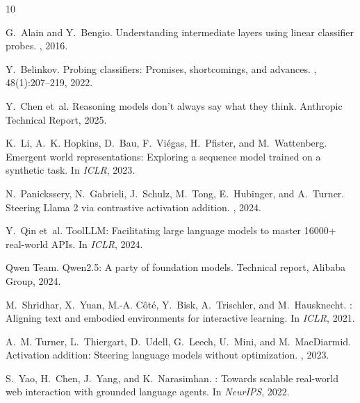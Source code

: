 \documentclass[11pt]{article}
\begin{document}

\begin{thebibliography}{10}

G.~Alain and Y.~Bengio.
\newblock Understanding intermediate layers using linear classifier probes.
, 2016.

Y.~Belinkov.
\newblock Probing classifiers: Promises, shortcomings, and advances.
, 48(1):207--219, 2022.

Y.~Chen et~al.
\newblock Reasoning models don't always say what they think.
\newblock Anthropic Technical Report, 2025.

K.~Li, A.~K. Hopkins, D.~Bau, F.~Vi{\'e}gas, H.~Pfister, and M.~Wattenberg.
\newblock Emergent world representations: Exploring a sequence model
  trained on a synthetic task.
\newblock In {\em ICLR}, 2023.

N.~Panickssery, N.~Gabrieli, J.~Schulz, M.~Tong, E.~Hubinger, and A.~Turner.
\newblock Steering Llama 2 via contrastive activation addition.
, 2024.

Y.~Qin et~al.
\newblock ToolLLM: Facilitating large language models to master 16000+
  real-world APIs.
\newblock In {\em ICLR}, 2024.

Qwen Team.
\newblock Qwen2.5: A party of foundation models.
\newblock Technical report, Alibaba Group, 2024.

M.~Shridhar, X.~Yuan, M.-A. C{\^o}t{\'e}, Y.~Bisk, A.~Trischler, and
  M.~Hausknecht.
: Aligning text and embodied environments for
  interactive learning.
\newblock In {\em ICLR}, 2021.

A.~M. Turner, L.~Thiergart, D.~Udell, G.~Leech, U.~Mini, and M.~MacDiarmid.
\newblock Activation addition: Steering language models without
  optimization.
, 2023.

S.~Yao, H.~Chen, J.~Yang, and K.~Narasimhan.
: Towards scalable real-world web interaction with
  grounded language agents.
\newblock In {\em NeurIPS}, 2022.

\end{thebibliography}
\end{document}

